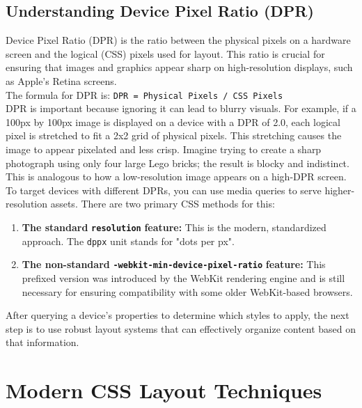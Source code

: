 \documentclass{scrbook}
\begin{document}
\section{Understanding Device Pixel Ratio (DPR)}

Device Pixel Ratio (DPR) is the ratio between the physical pixels on a hardware screen and the logical (CSS) pixels used for layout. This ratio is crucial for ensuring that images and graphics appear sharp on high-resolution displays, such as Apple's Retina screens. \\

The formula for DPR is: \texttt{DPR = Physical Pixels / CSS Pixels} \\

DPR is important because ignoring it can lead to blurry visuals. For example, if a 100px by 100px image is displayed on a device with a DPR of 2.0, each logical pixel is stretched to fit a 2x2 grid of physical pixels. This stretching causes the image to appear pixelated and less crisp. Imagine trying to create a sharp photograph using only four large Lego bricks; the result is blocky and indistinct. This is analogous to how a low-resolution image appears on a high-DPR screen. \\

To target devices with different DPRs, you can use media queries to serve higher-resolution assets. There are two primary CSS methods for this:

\begin{enumerate}
    \item \textbf{The standard} \texttt{\textbf{resolution}} \textbf{feature:} This is the modern, standardized approach. The \texttt{dppx} unit stands for "dots per px".
    \item \textbf{The non-standard} \texttt{\textbf{-webkit-min-device-pixel-ratio}} \textbf{feature:} This prefixed version was introduced by the WebKit rendering engine and is still necessary for ensuring compatibility with some older WebKit-based browsers.
\end{enumerate}

After querying a device's properties to determine which styles to apply, the next step is to use robust layout systems that can effectively organize content based on that information.

\chapter{Modern CSS Layout Techniques}
\end{document}

